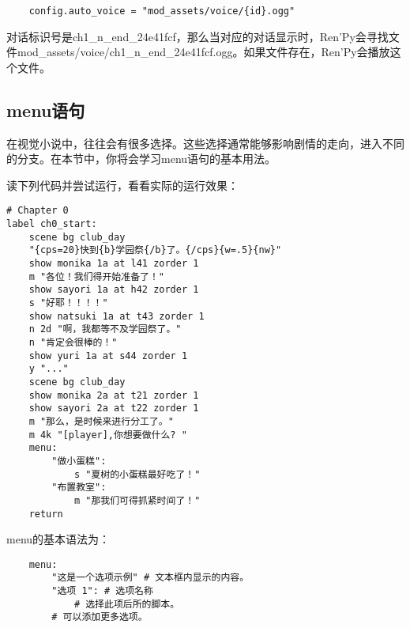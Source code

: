\begin{lstlisting}
    config.auto_voice = "mod_assets/voice/{id}.ogg"
\end{lstlisting}

对话标识号是ch1\_n\_end\_24e41fcf，那么当对应的对话显示时，Ren'Py会寻找文件mod\_assets/voice/ch1\_n\_end\_24e41fcf.ogg。如果文件存在，Ren'Py会播放这个文件。

\subsection{menu语句}
在视觉小说中，往往会有很多选择。这些选择通常能够影响剧情的走向，进入不同的分支。在本节中，你将会学习menu语句的基本用法。

读下列代码并尝试运行，看看实际的运行效果：
\begin{lstlisting}[caption=script-ch1.rpy]
# Chapter 0
label ch0_start:
    scene bg club_day
    "{cps=20}快到{b}学园祭{/b}了。{/cps}{w=.5}{nw}"
    show monika 1a at l41 zorder 1
    m "各位！我们得开始准备了！"
    show sayori 1a at h42 zorder 1
    s "好耶！！！！"
    show natsuki 1a at t43 zorder 1
    n 2d "啊，我都等不及学园祭了。"
    n "肯定会很棒的！"
    show yuri 1a at s44 zorder 1
    y "..."
    scene bg club_day
    show monika 2a at t21 zorder 1
    show sayori 2a at t22 zorder 1
    m "那么，是时候来进行分工了。"
    m 4k "[player],你想要做什么? "
    menu:
        "做小蛋糕":
            s "夏树的小蛋糕最好吃了！"
        "布置教室":
            m "那我们可得抓紧时间了！"
    return
\end{lstlisting}

menu的基本语法为：
\begin{lstlisting}
    menu:
        "这是一个选项示例" # 文本框内显示的内容。
        "选项 1": # 选项名称
            # 选择此项后所的脚本。
        # 可以添加更多选项。
\end{lstlisting}
